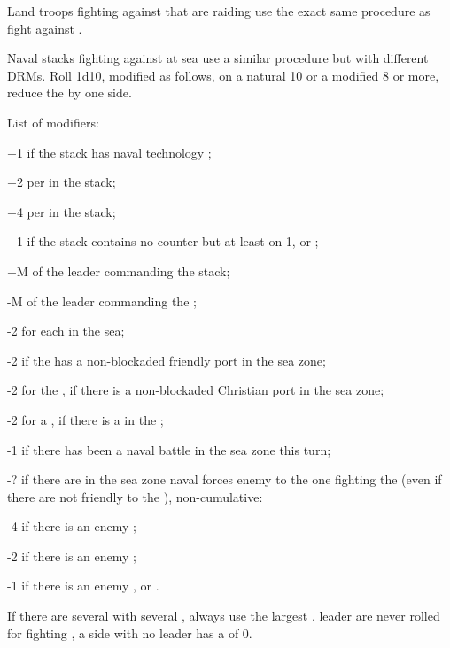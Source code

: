 Land troops fighting against \corsaire that are raiding use the exact same
procedure as fight against \RevReb.

Naval stacks fighting against \corsaire at sea use a similar procedure but
with different DRMs. Roll 1d10, modified as follows, on a natural 10 or a
modified 8 or more, reduce the \corsaire by one side.

List of modifiers:
\begin{modlist}
\item[+1] if the stack has naval technology \TSF;
\item[+2] per \FLEET\facemoins in the stack;
\item[+4] per \FLEET\faceplus in the stack;
\item[+1] if the stack contains no \FLEET counter but at least on 1\NDE, \NWD
  or \NGD;
\item[+M] \Man of the leader commanding the stack;
\item[-M] \Man of the leader commanding the \corsaire;
\item[-2] for each \corsaire\faceplus in the sea;
\item[-2] if the \corsaire has a non-blockaded friendly port in the sea zone;
\item[-2] for the  \corsaire, if there is a non-blockaded
  Christian port in the sea zone;
\item[-2] for a  \corsaire, if there is a 
  in the \STZ;
\item[-1] if there has been a naval battle in the sea zone this turn;
\item[-?] if there are in the sea zone naval forces enemy to the one fighting
  the \corsaire (even if there are not friendly to the \corsaire),
  non-cumulative:
  \begin{modlisti}
  \item[-4] if there is an enemy \FLEET\faceplus;
  \item[-2] if there is an enemy \FLEET\facemoins;
  \item[-1] if there is an enemy \NDE, \NWD or \NGD.
  \end{modlisti}
\end{modlist}

If there are several \corsaire with several \LeaderP, always use the largest
\Man.  leader are never rolled for fighting \corsaire, a
side with no leader has a \Man of 0.


